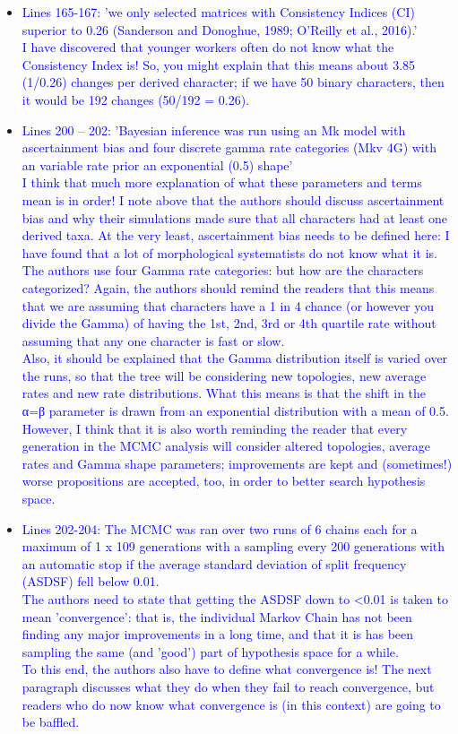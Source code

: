 \documentclass[12pt,letterpaper]{article}
\begin{document}
\begin{itemize}
\item{\textcolor{blue}{Lines 165-167: 'we only selected matrices with Consistency Indices (CI) superior to 0.26 (Sanderson and Donoghue, 1989; O’Reilly et al., 2016).'
\\
I have discovered that younger workers often do not know what the Consistency Index is! So, you might explain that this means about 3.85 (1/0.26) changes per derived character; if we have 50 binary characters, then it would be 192 changes (50/192 = 0.26).}}

\item{\textcolor{blue}{Lines 200 – 202: 'Bayesian inference was run using an Mk model with ascertainment bias and four discrete gamma rate categories (Mkv 4G) with an variable rate prior an exponential (0.5) shape'
\\
I think that much more explanation of what these parameters and terms mean is in order! I note above that the authors should discuss ascertainment bias and why their simulations made sure that all characters had at least one derived taxa. At the very least, ascertainment bias needs to be defined here: I have found that a lot of morphological systematists do not know what it is.
\\
The authors use four Gamma rate categories: but how are the characters categorized? Again, the authors should remind the readers that this means that we are assuming that characters have a 1 in 4 chance (or however you divide the Gamma) of having the 1st, 2nd, 3rd or 4th quartile rate without assuming that any one character is fast or slow.
\\
Also, it should be explained that the Gamma distribution itself is varied over the runs, so that the tree will be considering new topologies, new average rates and new rate distributions. What this means is that the shift in the α=β parameter is drawn from an exponential distribution with a mean of 0.5. However, I think that it is also worth reminding the reader that every generation in the MCMC analysis will consider altered topologies, average rates and Gamma shape parameters; improvements are kept and (sometimes!) worse propositions are accepted, too, in order to better search hypothesis space.}}

\item{\textcolor{blue}{Lines 202-204: The MCMC was ran over two runs of 6 chains each for a maximum of 1 x 109 generations with a sampling every 200 generations with an automatic stop if the average standard deviation of split frequency (ASDSF) fell below 0.01.
\\
The authors need to state that getting the ASDSF down to <0.01 is taken to mean 'convergence': that is, the individual Markov Chain has not been finding any major improvements in a long time, and that it is has been sampling the same (and 'good') part of hypothesis space for a while.
\\
To this end, the authors also have to define what convergence is! The next paragraph discusses what they do when they fail to reach convergence, but readers who do now know what convergence is (in this context) are going to be baffled.}}


\end{itemize}
\end{document}

